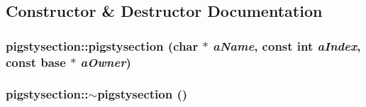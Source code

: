 \subsection{Constructor \& Destructor Documentation}
\hypertarget{classpigstysection_a7a2d131cd582c2d5b7029b49468818d9}{
\subsubsection[{pigstysection}]{\setlength{\rightskip}{0pt plus 5cm}pigstysection::pigstysection (char $\ast$ {\em aName}, \/  const int {\em aIndex}, \/  const {\bf base} $\ast$ {\em aOwner})}}
\label{classpigstysection_a7a2d131cd582c2d5b7029b49468818d9}
\hypertarget{classpigstysection_a6b4916d8fc18b3b587a4fd88fbc006ac}{
\subsubsection[{$\sim$pigstysection}]{\setlength{\rightskip}{0pt plus 5cm}pigstysection::$\sim$pigstysection ()}}
\label{classpigstysection_a6b4916d8fc18b3b587a4fd88fbc006ac}


